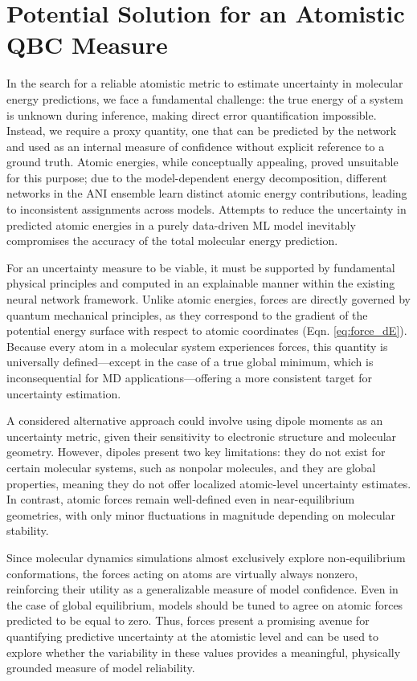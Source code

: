 \section{Potential Solution for an Atomistic QBC Measure}
\label{sec:uncertainty_potential_solution}

In the search for a reliable atomistic metric to estimate uncertainty in molecular energy predictions, we face a fundamental challenge: the true energy of a system is unknown during inference, making direct error quantification impossible. 
Instead, we require a proxy quantity, one that can be predicted by the network and used as an internal measure of confidence without explicit reference to a ground truth.
Atomic energies, while conceptually appealing, proved unsuitable for this purpose; due to the model-dependent energy decomposition, different networks in the ANI ensemble learn distinct atomic energy contributions, leading to inconsistent assignments across models.
Attempts to reduce the uncertainty in predicted atomic energies in a purely data-driven ML model inevitably compromises the accuracy of the total molecular energy prediction.

For an uncertainty measure to be viable, it must be supported by fundamental physical principles and computed in an explainable manner within the existing neural network framework. 
Unlike atomic energies, forces are directly governed by quantum mechanical principles, as they correspond to the gradient of the potential energy surface with respect to atomic coordinates (Eqn. \ref{eq:force_dE}). 
Because every atom in a molecular system experiences forces, this quantity is universally defined---except in the case of a true global minimum, which is inconsequential for MD applications---offering a more consistent target for uncertainty estimation.

A considered alternative approach could involve using dipole moments as an uncertainty metric, given their sensitivity to electronic structure and molecular geometry.
However, dipoles present two key limitations: they do not exist for certain molecular systems, such as nonpolar molecules, and they are global properties, meaning they do not offer localized atomic-level uncertainty estimates.
In contrast, atomic forces remain well-defined even in near-equilibrium geometries, with only minor fluctuations in magnitude depending on molecular stability.

Since molecular dynamics simulations almost exclusively explore non-equilibrium conformations, the forces acting on atoms are virtually always nonzero, reinforcing their utility as a generalizable measure of model confidence.
Even in the case of global equilibrium, models should be tuned to agree on atomic forces predicted to be equal to zero. 
Thus, forces present a promising avenue for quantifying predictive uncertainty at the atomistic level and can be used to explore whether the variability in these values provides a meaningful, physically grounded measure of model reliability.


